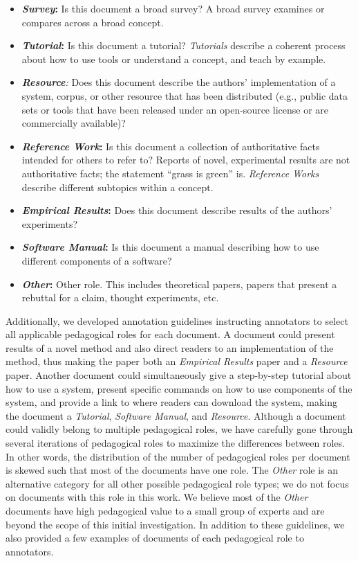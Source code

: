 \documentclass[11pt,a4paper]{article}
\begin{document}
\begin{itemize}
\setlength\itemsep{0.2em}
\item
\textbf{\textit{Survey}:} Is this document a broad survey? A broad survey examines or compares across a broad concept.
\item
\textbf{\textit{Tutorial}:} Is this document a tutorial? \textit{Tutorials} describe a coherent process about how to use tools or understand a concept, and teach by example.
\item
\textit{\textbf{Resource}:} Does this document describe the authors' implementation of a system, corpus, or other resource that has been distributed (e.g., public data sets or tools that have been released under an open-source license or are commercially available)?
\item
\textbf{\textit{Reference Work}:} Is this document a collection of authoritative facts intended for others to refer to? Reports of novel, experimental results are not authoritative facts; the statement ``grass is green'' is. \textit{Reference Works} describe different subtopics within a concept.
\item
\textbf{\textit{Empirical Results}:} Does this document describe results of the authors' experiments?
\item
\textbf{\textit{Software Manual}:} Is this document a manual describing how to use different components of a software?
\item
\textbf{\textit{Other}:} Other role. This includes theoretical papers, papers that present a rebuttal for a claim, thought experiments, etc.
\end{itemize}

Additionally, we developed annotation guidelines instructing annotators to select all applicable pedagogical roles for each document. A document could present results of a novel method and also direct readers to an implementation of the method, thus making the paper both an \textit{Empirical Results} paper and a \textit{Resource} paper. Another document could simultaneously give a step-by-step tutorial about how to use a system, present specific commands on how to use components of the system, and provide a link to where readers can download the system, making the document a \textit{Tutorial}, \textit{Software Manual}, and \textit{Resource}. Although a document could validly belong to multiple pedagogical roles, we have carefully gone through several iterations of pedagogical roles to maximize the differences between roles. In other words, the distribution of the number of pedagogical roles per document is skewed such that most of the documents have one role. The \textit{Other} role is an alternative category for all other possible pedagogical role types; we do not focus on documents with this role in this work. We believe most of the \textit{Other} documents have high pedagogical value to a small group of experts and are beyond the scope of this initial investigation. In addition to these guidelines, we also provided a few examples of documents of each pedagogical role to annotators.
\end{document}

